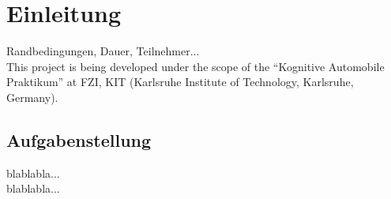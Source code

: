 
\chapter{Einleitung} %
\label{cha:Einleitung}
Randbedingungen, Dauer, Teilnehmer...\\

This project is being developed under the scope of the “Kognitive Automobile Praktikum” at FZI, KIT (Karlsruhe Institute of Technology, Karlsruhe, Germany).

\section{Aufgabenstellung} %
\label{sec:Aufgabenstellung}
blablabla...\\

blablabla...

